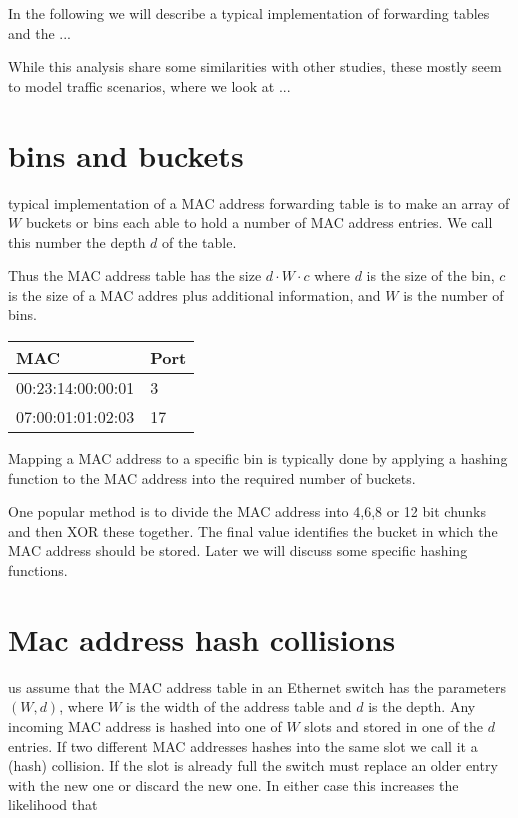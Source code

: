 \documentclass[journal]{IEEEtran}
\begin{document}
In the following we will describe a typical implementation of 
forwarding tables and the ...

While this analysis share some similarities with other studies,
these mostly seem to model traffic scenarios, where we look
at ...

\section{bins and buckets}
typical implementation of a MAC address forwarding table is 
to make an array of $W$ buckets or bins each able to hold a number
of MAC address entries. We call this number the depth $d$ of the table.

Thus the MAC address table has the size $d\cdot W \cdot c$ where $d$ is the size of the bin, $c$ is the size of a MAC addres plus additional 
information, and  $W$ is the number of bins. 


\begin{center}
\begin{tabular}{ll}
\hline
MAC & Port \\ 
\hline
00:23:14:00:00:01 &  3 \\
07:00:01:01:02:03 &  17 \\
\hline
\end{tabular}
\end{center}

Mapping a MAC address to a specific bin is typically done by applying a hashing 
function to the MAC address into the required number of buckets.

One popular method is to divide the MAC address into 4,6,8 or 12 bit chunks and then 
XOR these together. The final value identifies the bucket in which
the MAC address should be stored. Later we will discuss some specific hashing functions.




\section{Mac address hash collisions}

 us assume that the MAC address table in an Ethernet switch has the parameters $(W,d)$, where $W$ is the width of the 
address table and $d$ is the depth. Any incoming MAC address is hashed into one of $W$ slots and stored
in one of the $d$ entries. If two different MAC addresses hashes into the same slot we call it a (hash) collision.
 If the slot is already full the switch must replace an older entry with the new one or discard 
the new one. In either case this increases the likelihood that  
\end{document}
